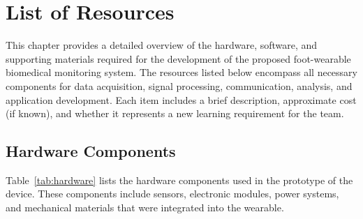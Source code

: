 \chapter{List of Resources}

This chapter provides a detailed overview of the hardware, software, and supporting materials required for the development of the proposed foot-wearable biomedical monitoring system. The resources listed below encompass all necessary components for data acquisition, signal processing, communication, analysis, and application development. Each item includes a brief description, approximate cost (if known), and whether it represents a new learning requirement for the team.

\newpage
\section{Hardware Components}

Table~\ref{tab:hardware} lists the hardware components used in the prototype of the device. These components include sensors, electronic modules, power systems, and mechanical materials that were integrated into the wearable.

